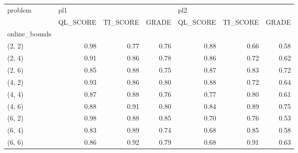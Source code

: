 \begin{tabular}{lrrrrrr}
\toprule
problem & \multicolumn{3}{l}{pl1} & \multicolumn{3}{l}{pl2} \\
{} & QL\_SCORE & TI\_SCORE & GRADE & QL\_SCORE & TI\_SCORE & GRADE \\
online\_bounds &          &          &       &          &          &       \\
\midrule
(2, 2)        &     0.98 &     0.77 &  0.76 &     0.88 &     0.66 &  0.58 \\
(2, 4)        &     0.91 &     0.86 &  0.78 &     0.86 &     0.72 &  0.62 \\
(2, 6)        &     0.85 &     0.88 &  0.75 &     0.87 &     0.83 &  0.72 \\
(4, 2)        &     0.93 &     0.86 &  0.80 &     0.88 &     0.72 &  0.64 \\
(4, 4)        &     0.87 &     0.88 &  0.76 &     0.77 &     0.80 &  0.61 \\
(4, 6)        &     0.88 &     0.91 &  0.80 &     0.84 &     0.89 &  0.75 \\
(6, 2)        &     0.98 &     0.88 &  0.85 &     0.70 &     0.76 &  0.53 \\
(6, 4)        &     0.83 &     0.89 &  0.74 &     0.68 &     0.85 &  0.58 \\
(6, 6)        &     0.86 &     0.92 &  0.79 &     0.68 &     0.91 &  0.63 \\
\bottomrule
\end{tabular}
